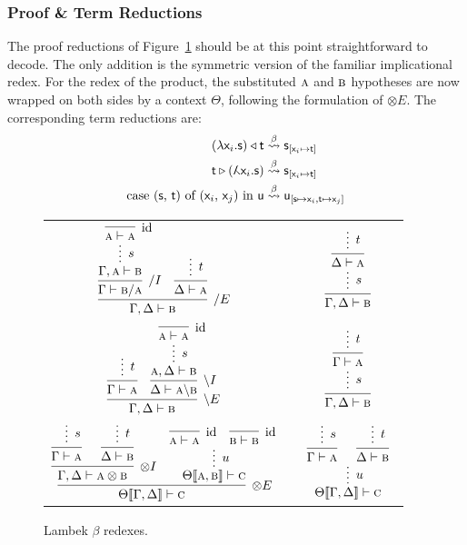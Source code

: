 \subsubsection{Proof \& Term Reductions}
The proof reductions of Figure~\ref{figure:lambek_proof_reductions} should be at this point straightforward to decode.
The only addition is the symmetric version of the familiar implicational redex.
For the redex of the product, the substituted $\normalfont\textsc{a}$ and $\normalfont\textsc{b}$ hypotheses are now wrapped on both sides by a context $\Theta$, following the formulation of $\otimes E$.
The corresponding term reductions are:
\begin{align}
(\term{\lam \vari .s})\appright\term{t} & \bred \term{s}_{[\term{\vari } \mapsto \term{t}]}\\
\term{t}\appleft(\term{\adbmal \vari .s}) & \bred \term{s}_{[\term{\vari } \mapsto \term{t}]}\\
\cterm{case (\smallterm{s}, \smallterm{t}) of (\smallterm{\vari }, \smallterm{\varj}) in \smallterm{u}} & \bred \term{u_{[\term{s} \mapsto \term{\vari }, \term{t} \mapsto \term{\varj}]}}
\end{align}

\begin{figure}
	\centering
	\begin{tabularx}{0.95\textwidth}{@{}ccc@{}}
	$\infer[\divright E]{\Gamma, \Delta \vdash \prop{b}}{
	\infer[\divright I]{\Gamma \vdash \prop{b} \divright \prop{a}}{
		\infer*[s]{\Gamma, \prop{a} \vdash \prop{b}}{
				\infer[\Ax]{\prop{a} \vdash \prop{a}}{} 
			}
		}
		&
		\infer{\Delta \vdash \prop{a}}{
			\infer*[t]{}{}
		}
	}$
	&
	\raisebox{20pt}{$\implies$}
	&
	$ 
	\infer[]{\Gamma, \Delta \vdash \prop{b}}{
		\infer*[s]{}{
		\infer[]{\Delta \vdash \prop{a}}{
			\infer*[t]{}{}
		}}
	}
	$\\[\smallsep]
	$\infer[\divleft E]{\Gamma, \Delta \vdash \prop{b}}{
		\infer{\Gamma \vdash \prop{a}}{
			\infer*[t]{}{}
		}
		&
		\infer[\divleft I]{\Delta \vdash \prop{a} \divleft \prop{b}}{
			\infer*[s]{\prop{a}, \Delta \vdash \prop{b}}{
				\infer[\Ax]{\prop{a} \vdash \prop{a}}{} 
			}
		}
	}$
	&
	\raisebox{20pt}{$\implies$}
	&
	$ 
	\infer[]{\Gamma, \Delta \vdash \prop{b}}{
		\infer*[s]{}{
		\infer[]{\Gamma \vdash \prop{a}}{
			\infer*[t]{}{}
		}}
	}
	$\\[\smallsep]
	$
	\infer[\otimes E]{\Theta\ctx{\Gamma, \Delta} \vdash \prop{c}}{
		\infer[\otimes I]{\Gamma, \Delta \vdash \prop{a} \otimes \prop{b}}{
			\infer[]{\Gamma \vdash \prop{a}}{\infer*[s]{}{}}
			&
			\infer[]{\Delta \vdash \prop{b}}{\infer*[t]{}{}}
		}		
		&
		\infer*[u]{\Theta\ctx{\prop{a}, \prop{b}} \vdash \prop{c}}{
			\infer[\Ax]{\prop{a} \vdash \prop{a}}{}
			& 
			\infer[\Ax]{\prop{b} \vdash \prop{b}}{}
		}
	}
	$
	&
	\raisebox{20pt}{$\implies$}
	&
	$
	\infer*[u]{\Theta\ctx{\Gamma, \Delta} \vdash \prop{c}}{
		\infer[]{\Gamma \vdash \prop{a}}{
			\infer*[s]{}{}
		}
		&
		\infer[]{\Delta \vdash \prop{b}}{
			\infer*[t]{}{}
		}
	}
	$
	\end{tabularx}
	\caption{Lambek $\beta$ redexes.}
	\label{figure:lambek_proof_reductions}
\end{figure}

